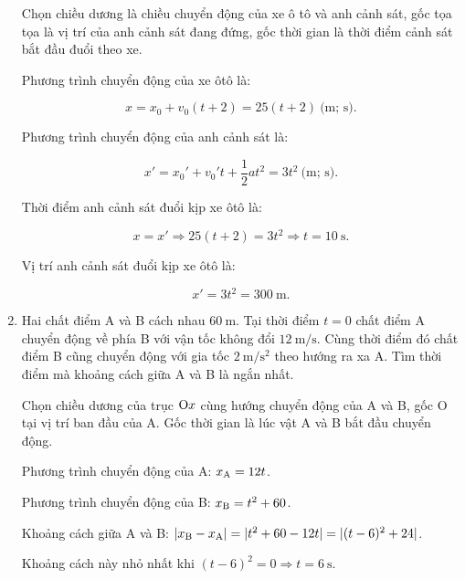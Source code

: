 \begin{enumerate}[label=\bfseries Bài \arabic*:]
\hideall
{	
	Chọn chiều dương là chiều chuyển động của xe ô tô và anh cảnh sát, gốc tọa tọa là vị trí của anh cảnh sát đang đứng, gốc thời gian là thời điểm cảnh sát bắt đầu đuổi theo xe.
	
	Phương trình chuyển động của xe ôtô là:
	
	$$x=x_0+v_0(t+2)=25(t+2)\ \text{(m; s)}.$$
	
	Phương trình chuyển động của anh cảnh sát là:
	
	$$x'=x_0'+v_0't+\dfrac{1}{2}at^2=3t^2\ \text{(m; s)}.$$
	
	Thời điểm anh cảnh sát đuổi kịp xe ôtô là:
	
	$$x=x'\Rightarrow 25(t+2)=3t^2\Rightarrow t=\SI{10}{\second}.$$
	
	Vị trí anh cảnh sát đuổi kịp xe ôtô là:
	
	$$x'=3t^2=\SI{300}{\meter}.$$
}
\item {}


{
	Hai chất điểm A và B cách nhau $\SI{60}{\meter}$. Tại thời điểm $t=0$ chất điểm A chuyển động về phía B với vận tốc không đổi $\SI{12}{\meter / \second}$. Cùng thời điểm đó chất điểm B cũng chuyển động với gia tốc $\SI{2}{\meter / \second \squared}$ theo hướng ra xa A. Tìm thời điểm mà khoảng cách giữa A và B là ngắn nhất.
}

\hideall
{Chọn chiều dương của trục $\text O x$ cùng hướng chuyển động của A và B, gốc O tại vị trí ban đầu của A. Gốc thời gian là lúc vật A và B bắt đầu chuyển động.
	
	Phương trình chuyển động của A: $x_\text A = 12t$.
	
	Phương trình chuyển động của B: $x_\text B = t^2 + 60$.
	
	Khoảng cách giữa A và B: $|x_\text B - x_\text A |=|t^2+60-12t|=|(t-6)^2+24|$.
	
	Khoảng cách này nhỏ nhất khi $(t-6)^2 = 0 \Rightarrow t=\SI{6}{\second}$.
}
\end{enumerate}

